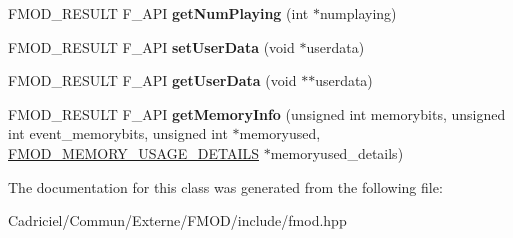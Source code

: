 \begin{DoxyCompactItemize}
\item 
\hypertarget{class_f_m_o_d_1_1_sound_group_af88057e101e4dd2268d1a6f6656db75b}{F\-M\-O\-D\-\_\-\-R\-E\-S\-U\-L\-T F\-\_\-\-A\-P\-I {\bfseries get\-Num\-Playing} (int $\ast$numplaying)}\label{class_f_m_o_d_1_1_sound_group_af88057e101e4dd2268d1a6f6656db75b}

\item 
\hypertarget{class_f_m_o_d_1_1_sound_group_a3315678b522baf2d74f732ab671f48c7}{F\-M\-O\-D\-\_\-\-R\-E\-S\-U\-L\-T F\-\_\-\-A\-P\-I {\bfseries set\-User\-Data} (void $\ast$userdata)}\label{class_f_m_o_d_1_1_sound_group_a3315678b522baf2d74f732ab671f48c7}

\item 
\hypertarget{class_f_m_o_d_1_1_sound_group_ac428e826a819030cbab7ffa666d7d9cd}{F\-M\-O\-D\-\_\-\-R\-E\-S\-U\-L\-T F\-\_\-\-A\-P\-I {\bfseries get\-User\-Data} (void $\ast$$\ast$userdata)}\label{class_f_m_o_d_1_1_sound_group_ac428e826a819030cbab7ffa666d7d9cd}

\item 
\hypertarget{class_f_m_o_d_1_1_sound_group_aab478a5f6edb8ef0eaf8d8fc70d1a448}{F\-M\-O\-D\-\_\-\-R\-E\-S\-U\-L\-T F\-\_\-\-A\-P\-I {\bfseries get\-Memory\-Info} (unsigned int memorybits, unsigned int event\-\_\-memorybits, unsigned int $\ast$memoryused, \hyperlink{struct_f_m_o_d___m_e_m_o_r_y___u_s_a_g_e___d_e_t_a_i_l_s}{F\-M\-O\-D\-\_\-\-M\-E\-M\-O\-R\-Y\-\_\-\-U\-S\-A\-G\-E\-\_\-\-D\-E\-T\-A\-I\-L\-S} $\ast$memoryused\-\_\-details)}\label{class_f_m_o_d_1_1_sound_group_aab478a5f6edb8ef0eaf8d8fc70d1a448}

\end{DoxyCompactItemize}


The documentation for this class was generated from the following file\-:\begin{DoxyCompactItemize}
\item 
Cadriciel/\-Commun/\-Externe/\-F\-M\-O\-D/include/fmod.\-hpp\end{DoxyCompactItemize}
